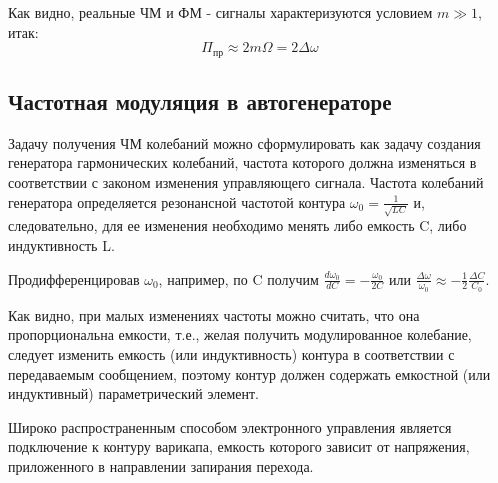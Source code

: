 \documentclass[a4paper,12pt]{article}
\begin{document}
Как видно, реальные ЧМ и ФМ - сигналы характеризуются условием $m\gg1$, итак:
\begin{equation}
	\Pi_\text{пр} \approx 2 m \Omega=2 \Delta \omega
\end{equation}

\subsection{Частотная модуляция в автогенераторе}
Задачу получения ЧМ колебаний можно сформулировать как задачу создания генератора гармонических колебаний, частота которого должна изменяться в соответствии с законом изменения управляющего сигнала. Частота колебаний генератора
определяется резонансной частотой контура $\omega_{0}=\frac{1}{\sqrt{L C}}$ и, следовательно, для ее
изменения необходимо менять либо емкость C, либо индуктивность L.
		
Продифференцировав $\omega_0$, например, по C получим $\frac{d \omega_{0}}{d C}=-\frac{\omega_{0}}{2 C}$ или $\frac{\Delta \omega}{\omega_{0}} \approx-\frac{1}{2} \frac{\Delta C}{C_{0}}$.

Как видно, при малых изменениях частоты можно считать, что она пропорциональна емкости, т.е., желая получить модулированное колебание, следует изменить емкость (или индуктивность) контура в соответствии с передаваемым сообщением, поэтому контур должен содержать емкостной (или индуктивный) параметрический элемент.

Широко распространенным способом электронного управления является подключение к контуру варикапа, емкость которого зависит от напряжения, приложенного в направлении запирания перехода.
\end{document}
